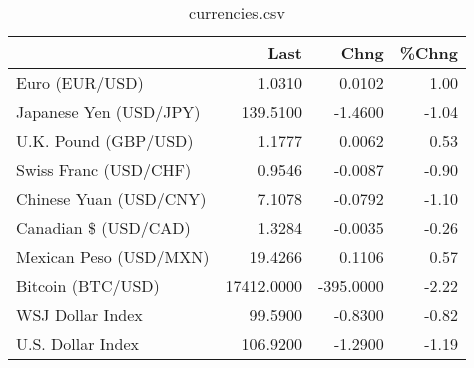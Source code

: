 \documentclass{article}%
\begin{document}
%


\begin{table}[htbp]%
\caption{currencies.csv}%
\centering%
\begin{adjustbox}{width=1\textwidth}%
\begin{tabular}{lrrr}
\toprule
                       &       Last &      Chng &  \%Chng \\
\midrule
        Euro (EUR/USD) &     1.0310 &    0.0102 &   1.00 \\
Japanese Yen (USD/JPY) &   139.5100 &   -1.4600 &  -1.04 \\
  U.K. Pound (GBP/USD) &     1.1777 &    0.0062 &   0.53 \\
 Swiss Franc (USD/CHF) &     0.9546 &   -0.0087 &  -0.90 \\
Chinese Yuan (USD/CNY) &     7.1078 &   -0.0792 &  -1.10 \\
  Canadian \$ (USD/CAD) &     1.3284 &   -0.0035 &  -0.26 \\
Mexican Peso (USD/MXN) &    19.4266 &    0.1106 &   0.57 \\
     Bitcoin (BTC/USD) & 17412.0000 & -395.0000 &  -2.22 \\
      WSJ Dollar Index &    99.5900 &   -0.8300 &  -0.82 \\
     U.S. Dollar Index &   106.9200 &   -1.2900 &  -1.19 \\
\bottomrule
\end{tabular}
%
\end{adjustbox}%
\end{table}

%
\end{document}
